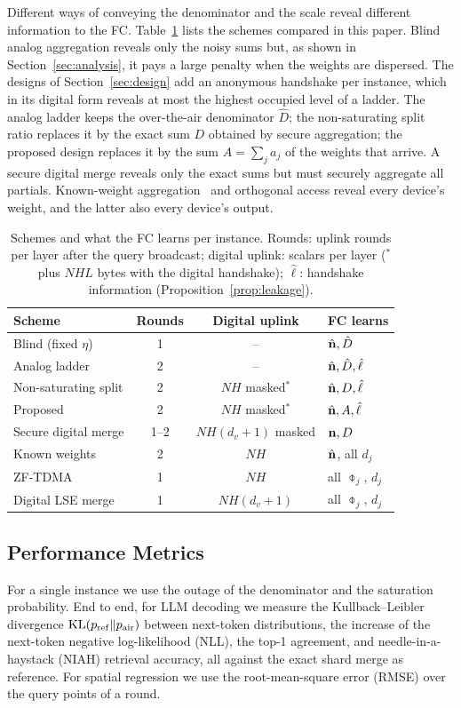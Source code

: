 Different ways of conveying the denominator and the scale reveal different information to the FC. Table~\ref{tab:schemes} lists the schemes compared in this paper. Blind analog aggregation reveals only the noisy sums but, as shown in Section~\ref{sec:analysis}, it pays a large penalty when the weights are dispersed. The designs of Section~\ref{sec:design} add an anonymous handshake per instance, which in its digital form reveals at most the highest occupied level of a ladder. The analog ladder keeps the over-the-air denominator $\hat D$; the non-saturating split ratio replaces it by the exact sum $D$ obtained by secure aggregation; the proposed design replaces it by the sum $A=\sum_ja_j$ of the weights that arrive. A secure digital merge reveals only the exact sums but must securely aggregate all partials. Known-weight aggregation~\cite{yang2026airmoe} and orthogonal access reveal every device's weight, and the latter also every device's output.

\begin{table}[t]
\centering
\caption{Schemes and what the FC learns per instance. Rounds: uplink rounds per layer after the query broadcast; digital uplink: scalars per layer ($^\ast$plus $NHL$ bytes with the digital handshake); $\hat\ell$: handshake information (Proposition~\ref{prop:leakage}).}
\label{tab:schemes}
\setlength{\tabcolsep}{3pt}
\begin{tabular}{@{}lccl@{}}
\toprule
Scheme & Rounds & Digital uplink & FC learns \\
\midrule
Blind (fixed $\eta$) & 1 & -- & $\hat{\mathbf{n}},\hat D$ \\
Analog ladder & 2 & -- & $\hat{\mathbf{n}},\hat D,\hat\ell$ \\
Non-saturating split & 2 & $NH$ masked$^\ast$ & $\hat{\mathbf{n}},D,\hat\ell$ \\
Proposed & 2 & $NH$ masked$^\ast$ & $\hat{\mathbf{n}},A,\hat\ell$ \\
Secure digital merge & 1--2 & $NH(d_v+1)$ masked & $\mathbf{n},D$ \\
Known weights~\cite{yang2026airmoe} & 2 & $NH$ & $\hat{\mathbf{n}}$, all $d_j$ \\
ZF-TDMA & 1 & $NH$ & all $\obar_j$, $d_j$ \\
Digital LSE merge & 1 & $NH(d_v+1)$ & all $\obar_j$, $d_j$ \\
\bottomrule
\end{tabular}
\end{table}

\subsection{Performance Metrics}

For a single instance we use the outage of the denominator and the saturation probability. End to end, for LLM decoding we measure the Kullback--Leibler divergence $\mathrm{KL}(p_{\rm ref}\|p_{\rm air})$ between next-token distributions, the increase of the next-token negative log-likelihood (NLL), the top-1 agreement, and needle-in-a-haystack (NIAH) retrieval accuracy, all against the exact shard merge as reference. For spatial regression we use the root-mean-square error (RMSE) over the query points of a round.
